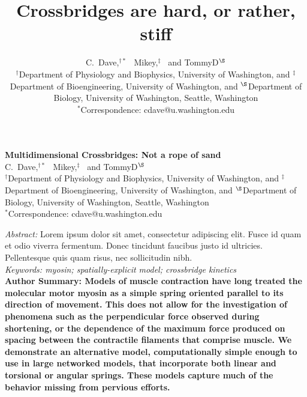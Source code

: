 \documentclass[11pt]{article}
\title{Crossbridges are hard, or rather, stiff}
\author{
	C.~Dave,$^{\dagger \ast}$~
	Mikey,$^\ddagger$~
	and TommyD$^\S$\\ 
	\small 
	$^\dagger$Department of Physiology and Biophysics, University of Washington, and 
	$^\ddagger$Department of Bioengineering, University of Washington, and 
	$^\S$Department of Biology, University of Washington, Seattle, Washington \\
	$^\ast$Correspondence: cdave@u.washington.edu
	\normalsize
}
\date{}
\begin{document}
{\selectfont

\LARGE
\noindent \textbf{Multidimensional Crossbridges: Not a rope of sand }\\

	\large
	\noindent C.~Dave,$^{\dagger \ast}$~
	Mikey,$^\ddagger$~
	and TommyD$^\S$\\ 
	\small 
	$^\dagger$Department of Physiology and Biophysics, University of Washington, and 
	$^\ddagger$Department of Bioengineering, University of Washington, and 
	$^\S$Department of Biology, University of Washington, Seattle, Washington \\
	$^\ast$Correspondence: cdave@u.washington.edu \\
	\normalsize


\noindent \emph{Abstract:} 
Lorem ipsum dolor sit amet, consectetur adipiscing elit. Fusce id quam et odio viverra fermentum. Donec tincidunt faucibus justo id ultricies. Pellentesque quis quam risus, nec sollicitudin nibh.   \\[.5em]
{\footnotesize \emph{
Keywords: myosin; spatially-explicit model; crossbridge kinetics}} \\[.5em]
 {\footnotesize \textbf{
 Author Summary: Models of muscle contraction have long treated the molecular motor myosin as a simple spring oriented parallel to its direction of movement. This does not allow for the investigation of phenomena such as the perpendicular force observed during shortening, or the dependence of the maximum force produced on spacing between the contractile filaments that comprise muscle. We demonstrate an alternative model, computationally simple enough to use in large networked models, that incorporate both linear and torsional or angular springs. These models capture much of the behavior missing from pervious efforts.}}} \\
\end{document}

